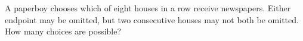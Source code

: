 A paperboy chooses which of eight houses in a row receive newspapers. Either endpoint may be omitted, but two consecutive houses may not both be omitted. How many choices are possible?
